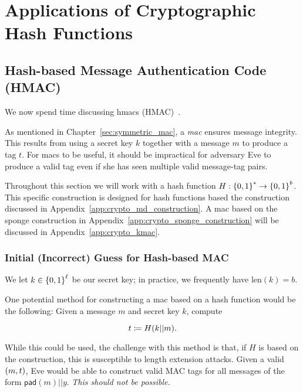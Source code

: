 \section{Applications of Cryptographic Hash Functions}

\subsection{Hash-based Message Authentication Code (HMAC)}
\label{app:crypto_hmac}

We now spend time discussing \glspl{hmac} (HMAC)~\cite{HMAC1996,rfc2104}.

As mentioned in Chapter~\ref{sec:symmetric_mac},
a \emph{\gls{mac}} ensures message integrity.
This results from using a secret key $k$ together with a message $m$
to produce a tag $t$.
For \glspl{mac} to be useful, it should be impractical for adversary Eve
to produce a valid tag even if she has seen multiple valid
message-tag pairs.

Throughout this section we will work with a \gls{hash function}
$H:\left\{ 0,1 \right\}^{*}\to\left\{ 0,1 \right\}^{b}$.
This specific construction is designed for \glspl{hash function}
based the \MD{} construction
discussed in Appendix~\ref{app:crypto_md_construction}.
A \gls{mac} based on the sponge construction in
Appendix~\ref{app:crypto_sponge_construction}
will be discussed in Appendix~\ref{app:crypto_kmac}.

\subsubsection{Initial (Incorrect) Guess for Hash-based MAC}

We let $k\in\left\{ 0,1 \right\}^{\ell}$ be our secret key;
in practice, we frequently have $\text{len}(k) = b$.

One potential method for constructing a \gls{mac} based on a
\gls{hash function} would be the following:
Given a message $m$ and secret key $k$, compute

\begin{equation}
    t \coloneqq{} H(k||m).
\end{equation}

\noindent
While this could be used, the challenge with this method is that,
if $H$ is based on the \MD{} construction,
this is susceptible to length extension attacks.
Given a valid $\left( m,t \right)$, Eve would be able to construct
valid MAC tags for all messages of the form $\textsf{pad}(m)||y$.
\emph{This should not be possible.}

